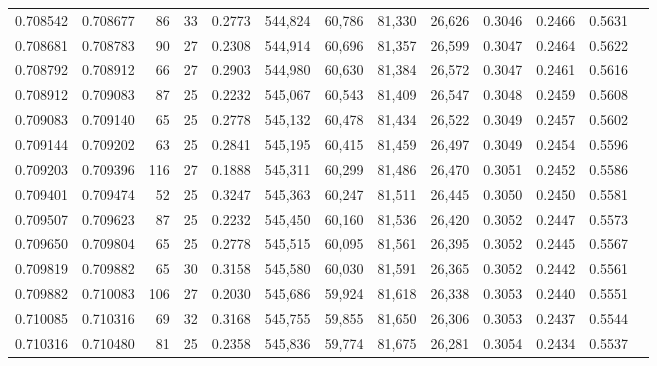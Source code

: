 \begin{tabular}{rrrrrrrrrrrrr}
0.708542 & 0.708677 &    86 &  33 &                                     0.2773 & 544,824 &  60,786 &  81,330 &  26,626 & 0.3046 & 0.2466 & 0.5631 \\
0.708681 & 0.708783 &    90 &  27 &                                     0.2308 & 544,914 &  60,696 &  81,357 &  26,599 & 0.3047 & 0.2464 & 0.5622 \\
0.708792 & 0.708912 &    66 &  27 &                                     0.2903 & 544,980 &  60,630 &  81,384 &  26,572 & 0.3047 & 0.2461 & 0.5616 \\
0.708912 & 0.709083 &    87 &  25 &                                     0.2232 & 545,067 &  60,543 &  81,409 &  26,547 & 0.3048 & 0.2459 & 0.5608 \\
0.709083 & 0.709140 &    65 &  25 &                                     0.2778 & 545,132 &  60,478 &  81,434 &  26,522 & 0.3049 & 0.2457 & 0.5602 \\
0.709144 & 0.709202 &    63 &  25 &                                     0.2841 & 545,195 &  60,415 &  81,459 &  26,497 & 0.3049 & 0.2454 & 0.5596 \\
0.709203 & 0.709396 &   116 &  27 &                                     0.1888 & 545,311 &  60,299 &  81,486 &  26,470 & 0.3051 & 0.2452 & 0.5586 \\
0.709401 & 0.709474 &    52 &  25 &                                     0.3247 & 545,363 &  60,247 &  81,511 &  26,445 & 0.3050 & 0.2450 & 0.5581 \\
0.709507 & 0.709623 &    87 &  25 &                                     0.2232 & 545,450 &  60,160 &  81,536 &  26,420 & 0.3052 & 0.2447 & 0.5573 \\
0.709650 & 0.709804 &    65 &  25 &                                     0.2778 & 545,515 &  60,095 &  81,561 &  26,395 & 0.3052 & 0.2445 & 0.5567 \\
0.709819 & 0.709882 &    65 &  30 &                                     0.3158 & 545,580 &  60,030 &  81,591 &  26,365 & 0.3052 & 0.2442 & 0.5561 \\
0.709882 & 0.710083 &   106 &  27 &                                     0.2030 & 545,686 &  59,924 &  81,618 &  26,338 & 0.3053 & 0.2440 & 0.5551 \\
0.710085 & 0.710316 &    69 &  32 &                                     0.3168 & 545,755 &  59,855 &  81,650 &  26,306 & 0.3053 & 0.2437 & 0.5544 \\
0.710316 & 0.710480 &    81 &  25 &                                     0.2358 & 545,836 &  59,774 &  81,675 &  26,281 & 0.3054 & 0.2434 & 0.5537 \\

\end{tabular}
